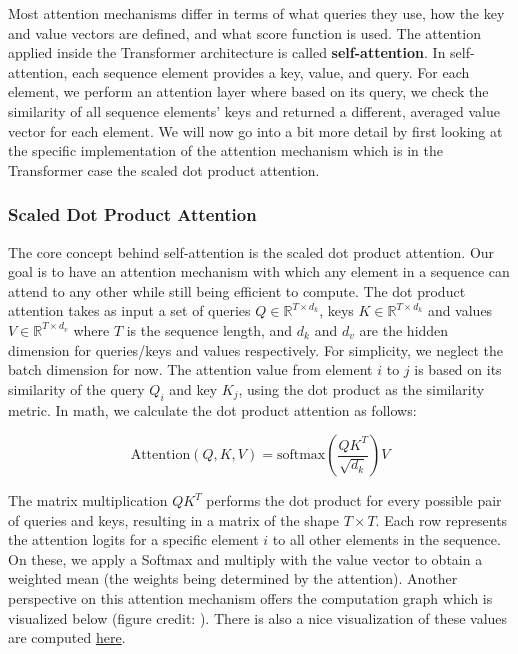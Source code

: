 Most attention mechanisms differ in terms of what queries they use, how the key and value vectors are defined,
and what score function is used.
The attention applied inside the Transformer architecture is called \textbf{self-attention}.
In self-attention, each sequence element provides a key, value, and query.
For each element, we perform an attention layer where based on its query,
we check the similarity of all sequence elements' keys and returned a different,
averaged value vector for each element.
We will now go into a bit more detail by first looking at the specific implementation of the attention mechanism which is in the Transformer case the scaled dot product attention.

\subsubsection{Scaled Dot Product Attention}

The core concept behind self-attention is the scaled dot product attention.
Our goal is to have an attention mechanism with which any element in a sequence can attend to any other while
still being efficient to compute.
The dot product attention takes as input a set of queries
$Q\in\mathbb{R}^{T\times d_k}$, keys $K\in\mathbb{R}^{T\times d_k}$
and values $V\in\mathbb{R}^{T\times d_v}$ where $T$ is the sequence length,
and $d_k$ and $d_v$ are the hidden dimension for queries/keys and values respectively.
For simplicity, we neglect the batch dimension for now.
The attention value from element $i$ to $j$ is based on its similarity of the query $Q_i$ and key $K_j$,
using the dot product as the similarity metric.
In math, we calculate the dot product attention as follows:

$$\text{Attention}(Q,K,V)=\text{softmax}\left(\frac{QK^T}{\sqrt{d_k}}\right)V$$

The matrix multiplication $QK^T$ performs the dot product for every possible pair of queries and keys,
resulting in a matrix of the shape $T\times T$.
Each row represents the attention logits for a specific element $i$ to all other elements in the sequence.
On these, we apply a Softmax and multiply with the value vector to obtain a weighted mean
(the weights being determined by the attention).
Another perspective on this attention mechanism offers the computation graph which is visualized below (figure credit: \cite{vaswani2017attention}). There is also a nice visualization of these values are computed \href{https://miro.medium.com/v2/resize:fit:1973/1*G8thyDVqeD8WHim_QzjvFg.gif}{here}.

